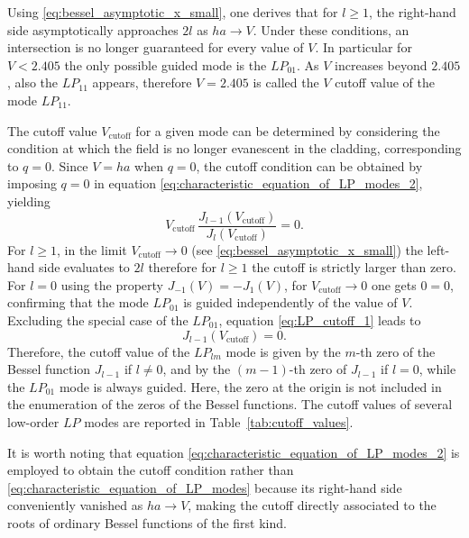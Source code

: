 Using \eqref{eq:bessel_asymptotic_x_small}, one derives that for $l\ge1$, the right-hand side asymptotically approaches $2l$ as $ha \rightarrow V$. Under these conditions, an intersection is no longer guaranteed for every value of $V$. In particular for $V<2.405$ the only possible guided mode is the $LP_{01}$. As $V$ increases beyond $2.405$, also the $LP_{11}$ appears, therefore $V=2.405$ is called the $V$ cutoff value of the mode $LP_{11}$.

The cutoff value $V_{\mathrm{cutoff}}$ for a given mode can be determined by considering the condition at which the field is no longer evanescent in the cladding, corresponding to $q=0$. Since $V=ha$ when $q=0$, the cutoff condition can be obtained by imposing $q=0$ in equation \eqref{eq:characteristic_equation_of_LP_modes_2}, yielding
\begin{equation}
    \label{eq:LP_cutoff_1}
    V_\text{cutoff}\, \frac{J_{l-1}(V_\text{cutoff})}{J_l(V_\text{cutoff})} = 0.
\end{equation}
For $l \ge 1$, in the limit $V_\text{cutoff}\rightarrow0$ (see \eqref{eq:bessel_asymptotic_x_small}) the left-hand side evaluates to $2l$ therefore for $l \ge 1$ the cutoff is strictly larger than zero. For $l = 0$ using the property $J_{-1}(V) = -J_1(V)$, for $V_\text{cutoff}\rightarrow0$ one gets $0 = 0$, confirming that the mode $LP_{01}$ is guided independently of the value of $V$. \\
Excluding the special case of the $LP_{01}$, equation \eqref{eq:LP_cutoff_1} leads to 
\begin{equation}
    J_{l-1}(V_\text{cutoff}) = 0.
\end{equation}
Therefore, the cutoff value of the $LP_{lm}$ mode is given by the $m$-th zero of the Bessel function $J_{l-1}$ if $l\neq0$, and by the $(m-1)$-th zero of $J_{l-1}$ if $l=0$, while the $LP_{01}$ mode is always guided. Here, the zero at the origin is not included in the enumeration of the zeros of the Bessel functions. The cutoff values of several low-order $LP$ modes are reported in Table~\ref{tab:cutoff_values}.


It is worth noting that equation \eqref{eq:characteristic_equation_of_LP_modes_2} is employed to obtain the cutoff condition rather than \eqref{eq:characteristic_equation_of_LP_modes} because its right-hand side conveniently vanished as $ha \rightarrow V$, making the cutoff directly associated to the roots of ordinary Bessel functions of the first kind.

